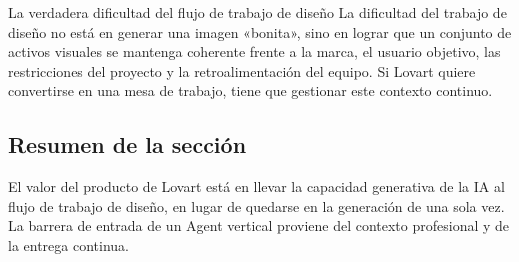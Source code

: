 \begin{importantbox}{La verdadera dificultad del flujo de trabajo de diseño}
La dificultad del trabajo de diseño no está en generar una imagen «bonita», sino en lograr que un conjunto de activos visuales se mantenga coherente frente a la marca, el usuario objetivo, las restricciones del proyecto y la retroalimentación del equipo. Si Lovart quiere convertirse en una mesa de trabajo, tiene que gestionar este contexto continuo.
\end{importantbox}

\subsection{Resumen de la sección}

El valor del producto de Lovart está en llevar la capacidad generativa de la IA al flujo de trabajo de diseño, en lugar de quedarse en la generación de una sola vez. La barrera de entrada de un Agent vertical proviene del contexto profesional y de la entrega continua.
